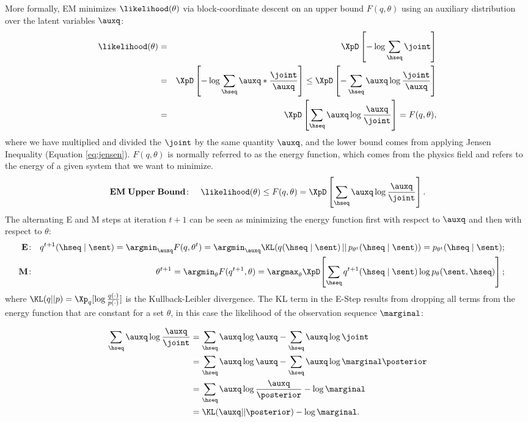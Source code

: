 More formally, EM minimizes $\likelihood(\theta)$ via block-coordinate descent on an upper bound $F(q,\theta)$ using an auxiliary distribution over the latent variables
$\auxq$:
\begin{eqnarray}
\likelihood(\theta)  &=& \XpD \left[-\log \sum_{\hseq}\joint \right]\\
\label{eq:jensen}&=& \XpD \left[-\log \sum_{\hseq}
\auxq*\frac{\joint}{\auxq}\right] \le \XpD \left[- \sum_{\hseq} \auxq\log \frac{\joint}{\auxq}\right] \\
&=& \XpD \left[\sum_{\hseq} \auxq\log \frac{\auxq}{\joint}\right] =  F(q,\theta),
\end{eqnarray}
where we have multiplied and divided the $\joint$ by the same quantity
$\auxq$, and 
the lower bound comes from applying Jensen Inequality (Equation
\ref{eq:jensen}). $F(q,\theta)$ is normally referred to as the energy
function, which comes from the physics field and refers to the energy of a given system that we want to minimize.
\begin{equation}
\mathbf{EM\;Upper\;Bound\!:}\;\;\;\;\;\likelihood(\theta) \le F(q,\theta) =
\XpD \left[\sum_{\hseq} \auxq\log \frac{\auxq}{\joint}\right].
\end{equation}
The alternating E and M steps at iteration $t+1$ can be seen as minimizing the energy function first 
with respect to $\auxq$ and then with respect to $\theta$:
\begin{eqnarray}
\hspace{-5mm}{\mathbf E\!:}&& q^{t+1}(\hseq\mid\sent) =
\argmin_{\auxq} F(q,\theta^t)
  = \argmin_{\auxq} \KL(q(\hseq\mid\sent)\,||\,p_{\theta^t}(\hseq\mid\sent)) = p_{\theta^t}(\hseq\mid\sent);
 \label{eq:e-step} \\
\hspace{-5mm}{\mathbf M\!:}&& \theta^{t+1} = \argmin_\theta
F(q^{t+1},\theta) = \argmax_\theta \XpD\!\left[\sum_{\hseq}
q^{t+1}(\hseq\mid\sent)\log p_\theta(\sent,\hseq)\right];
\label{eq:m-step}
\end{eqnarray}
where $\KL(q||p) = \Xp_q[\log \frac{q(\cdot)}{p(\cdot)}]$ is the
Kullback-Leibler divergence. The KL term in the E-Step results from 
dropping all terms from the energy function that are constant for a
set $\theta$, in this case the likelihood of the observation sequence
$\marginal$:

\begin{align}
\sum_{\hseq} \auxq\log \frac{\auxq}{\joint} &= \sum_{\hseq} \auxq\log
\auxq - \sum_{\hseq} \auxq\log \joint  \\ 
&= \sum_{\hseq} \auxq\log \auxq - \sum_{\hseq} \auxq\log \marginal
\posterior \\
&= \sum_{\hseq} \auxq\log \frac{\auxq}{\posterior} - \log \marginal \\
&= \KL(\auxq||\posterior) - \log \marginal.
\end{align}

